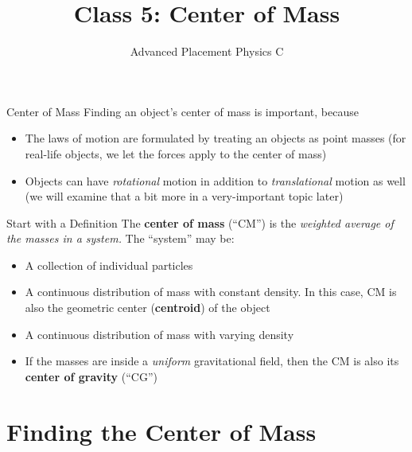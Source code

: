 \documentclass[12pt,compress,aspectratio=169]{beamer}
\title{Class 5: Center of Mass}
\subtitle{Advanced Placement Physics C}
\begin{document}
\begin{frame}
  \maketitle
\end{frame}



\begin{frame}{Center of Mass}
  Finding an object's center of mass is important, because
  \begin{itemize}
  \item The laws of motion are formulated by treating an objects as point
    masses (for real-life objects, we let the forces apply to the center of
    mass)
  \item Objects can have \emph{rotational} motion in addition to
    \emph{translational} motion as well (we will examine that a bit more in a
    very-important topic later)
  \end{itemize}
\end{frame}



\begin{frame}{Start with a Definition}
  The \textbf{center of mass} (``CM'') is the \emph{weighted average of the
  masses in a system.} The ``system'' may be:
  \begin{itemize}
  \item A collection of individual particles
  \item A continuous distribution of mass with constant density. In this case,
    CM is also the geometric center (\textbf{centroid}) of the object
  \item A continuous distribution of mass with varying density
  \item If the masses are inside a \emph{uniform} gravitational field, then the
    CM is also its \textbf{center of gravity} (``CG'')
  \end{itemize}
\end{frame}


\section{Finding the Center of Mass}
\end{document}
